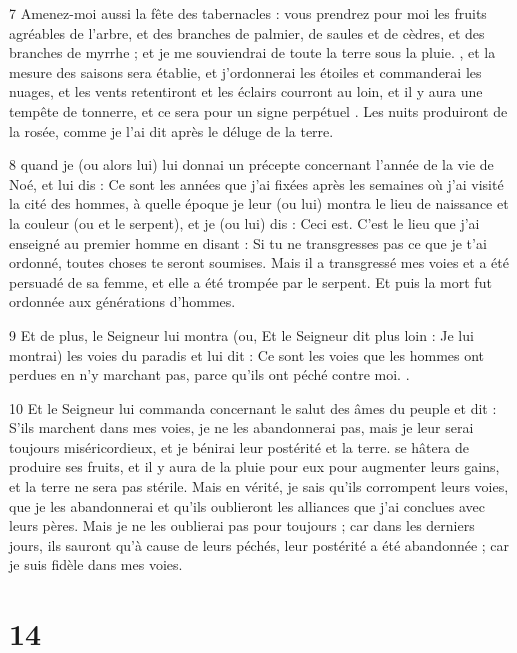 \par 7 Amenez-moi aussi la fête des tabernacles : vous prendrez pour moi les fruits agréables de l'arbre, et des branches de palmier, de saules et de cèdres, et des branches de myrrhe ; et je me souviendrai de toute la terre sous la pluie. , et la mesure des saisons sera établie, et j'ordonnerai les étoiles et commanderai les nuages, et les vents retentiront et les éclairs courront au loin, et il y aura une tempête de tonnerre, et ce sera pour un signe perpétuel . Les nuits produiront de la rosée, comme je l'ai dit après le déluge de la terre.

\par 8 quand je (ou alors lui) lui donnai un précepte concernant l'année de la vie de Noé, et lui dis : Ce sont les années que j'ai fixées après les semaines où j'ai visité la cité des hommes, à quelle époque je leur (ou lui) montra le lieu de naissance et la couleur (ou et le serpent), et je (ou lui) dis : Ceci est. C'est le lieu que j'ai enseigné au premier homme en disant : Si tu ne transgresses pas ce que je t'ai ordonné, toutes choses te seront soumises. Mais il a transgressé mes voies et a été persuadé de sa femme, et elle a été trompée par le serpent. Et puis la mort fut ordonnée aux générations d’hommes.

\par 9 Et de plus, le Seigneur lui montra (ou, Et le Seigneur dit plus loin : Je lui montrai) les voies du paradis et lui dit : Ce sont les voies que les hommes ont perdues en n'y marchant pas, parce qu'ils ont péché contre moi. .

\par 10 Et le Seigneur lui commanda concernant le salut des âmes du peuple et dit : S'ils marchent dans mes voies, je ne les abandonnerai pas, mais je leur serai toujours miséricordieux, et je bénirai leur postérité et la terre. se hâtera de produire ses fruits, et il y aura de la pluie pour eux pour augmenter leurs gains, et la terre ne sera pas stérile. Mais en vérité, je sais qu'ils corrompent leurs voies, que je les abandonnerai et qu'ils oublieront les alliances que j'ai conclues avec leurs pères. Mais je ne les oublierai pas pour toujours ; car dans les derniers jours, ils sauront qu'à cause de leurs péchés, leur postérité a été abandonnée ; car je suis fidèle dans mes voies.

\chapter{14}

